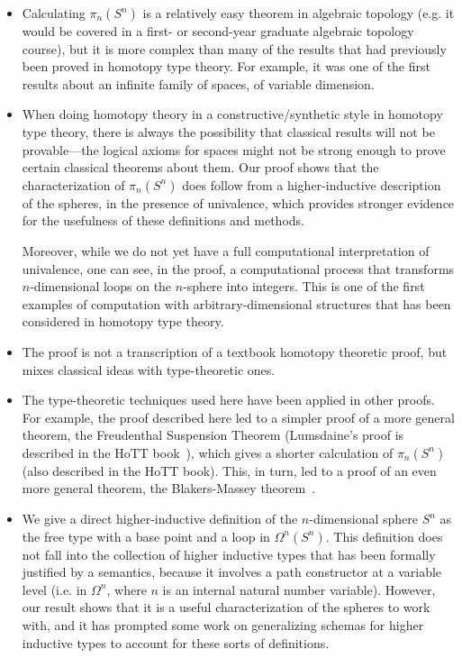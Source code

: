 \begin{itemize}

\item Calculating $\pi_n(S^n)$ is a relatively easy theorem in algebraic
  topology (e.g. it would be covered in a first- or second-year graduate
  algebraic topology course), but it is more complex than many of the
  results that had previously been proved in homotopy type theory.  For
  example, it was one of the first results about an infinite family of
  spaces, of variable dimension.

\item When doing homotopy theory in a constructive/synthetic
  style in homotopy type theory, there is always the possibility that
  classical results will not be provable---the logical axioms for spaces
  might not be strong enough to prove certain classical theorems about them.
  Our proof shows that the characterization of $\pi_n(S^n)$ does follow
  from a higher-inductive description of the spheres, in the presence of
  univalence, which provides stronger evidence for the usefulness of
  these definitions and methods.  

  Moreover, while we do not yet have a full computational interpretation
  of univalence, one can see, in the proof, a computational process that
  transforms $n$-dimensional loops on the $n$-sphere into integers.
  This is one of the first examples of computation with
  arbitrary-dimensional structures that has been considered in homotopy
  type theory.  

\item The proof is not a transcription of a textbook homotopy theoretic
  proof, but mixes classical ideas with type-theoretic ones.  

\item The type-theoretic techniques used here have been applied in other
  proofs.  For example, the proof described here led to a simpler proof
  of a more general theorem, the Freudenthal Suspension Theorem
  (Lumsdaine's proof is described in the HoTT book~\citep{uf13hott-book}), which
  gives a shorter calculation of $\pi_n(S^n)$ (also described in the
  HoTT book).  This, in turn, led to a proof of an even more general
  theorem, the Blakers-Massey theorem~\citep{fll13blakersmassey}.  

\item We give a direct higher-inductive definition of the
  $n$-dimensional sphere $S^n$ as the free type with a base point
   and a loop in $\Omega^n(S^n)$.  This definition does not
  fall into the collection of higher inductive types that has been
  formally justified by a semantics, because it involves a path
  constructor at a variable level (i.e. in $\Omega^n$, where $n$ is an
  internal natural number variable).  However, our result shows that it is a useful
  characterization of the spheres to work with, and it has prompted some
  work on generalizing schemas for higher inductive types to account for
  these sorts of definitions.


\end{itemize}

